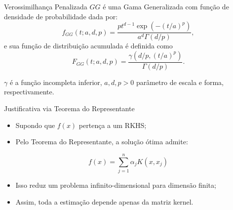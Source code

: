 \documentclass[aspectratio=169,t,xcolor=table]{beamer}
\begin{document}
\begin{frame}{Verossimilhança Penalizada}
$GG$ é uma Gama Generalizada com função de densidade de probabilidade dada por:
\[
f_{GG}(t;a,d,p)=
\frac{pt^{d-1}\exp\left(-(t/a)^p\right)}
{a^d\Gamma(d/p)},
\]
e sua função de distribuição acumulada é definida como
\[
F_{GG}(t;a,d,p)=
\frac{\gamma\left(d/p,(t/a)^p\right)}
{\Gamma(d/p)}.
\]

$\gamma$ é a função incompleta inferior, $a, d, p > 0$ parâmetro de escala e forma, respectivamente.
\end{frame}

\begin{frame}{Justificativa via Teorema do Representante}

\begin{itemize}
\item Supondo que $f(x)$ pertença a um RKHS;

\vspace{0.3cm}

\item Pelo Teorema do Representante, a solução ótima admite:

\end{itemize}

$$
f(x)=\sum_{j=1}^{n}\alpha_jK(x,x_j)
$$

\vspace{0.4cm}

\begin{itemize}
\item Isso reduz um problema infinito-dimensional para dimensão finita;

\vspace{0.3cm}

\item Assim, toda a estimação depende apenas da matriz kernel.

\end{itemize}

\end{frame}



\end{document}

